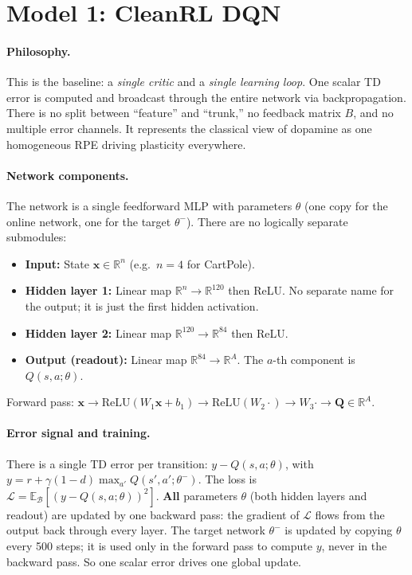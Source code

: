\documentclass[11pt]{article}
\begin{document}
\section{Model 1: CleanRL DQN}

\paragraph{Philosophy.} This is the baseline: a \emph{single critic} and a \emph{single learning loop}. One scalar TD error is computed and broadcast through the entire network via backpropagation. There is no split between ``feature'' and ``trunk,'' no feedback matrix $B$, and no multiple error channels. It represents the classical view of dopamine as one homogeneous RPE driving plasticity everywhere.

\paragraph{Network components.} The network is a single feedforward MLP with parameters $\theta$ (one copy for the online network, one for the target $\theta^-$). There are no logically separate submodules:
\begin{itemize}
\item \textbf{Input:} State $\mathbf{x} \in \mathbb{R}^n$ (e.g.\ $n=4$ for CartPole).
\item \textbf{Hidden layer 1:} Linear map $\mathbb{R}^n \to \mathbb{R}^{120}$ then ReLU. No separate name for the output; it is just the first hidden activation.
\item \textbf{Hidden layer 2:} Linear map $\mathbb{R}^{120} \to \mathbb{R}^{84}$ then ReLU.
\item \textbf{Output (readout):} Linear map $\mathbb{R}^{84} \to \mathbb{R}^A$. The $a$-th component is $Q(s,a;\theta)$.
\end{itemize}
Forward pass: $\mathbf{x} \to \text{ReLU}(W_1\mathbf{x}+b_1) \to \text{ReLU}(W_2 \cdot) \to W_3 \cdot \to \mathbf{Q} \in \mathbb{R}^A$.

\paragraph{Error signal and training.} There is a single TD error per transition: $y - Q(s,a;\theta)$, with $y = r + \gamma(1-d) \max_{a'} Q(s',a';\theta^-)$. The loss is $\mathcal{L} = \mathbb{E}_{\mathcal{B}}[(y - Q(s,a;\theta))^2]$. \textbf{All} parameters $\theta$ (both hidden layers and readout) are updated by one backward pass: the gradient of $\mathcal{L}$ flows from the output back through every layer. The target network $\theta^-$ is updated by copying $\theta$ every 500 steps; it is used only in the forward pass to compute $y$, never in the backward pass. So one scalar error drives one global update.
\end{document}

